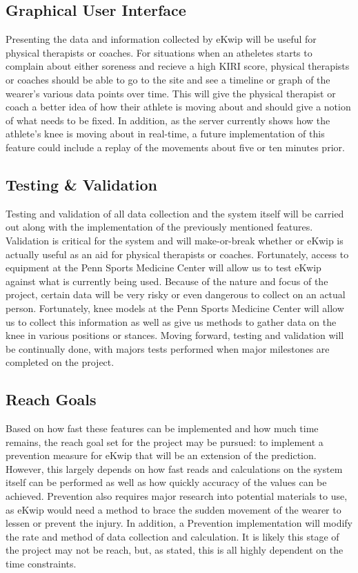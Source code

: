 \subsection {Graphical User Interface}
Presenting the data and information collected by eKwip will be useful for physical therapists or coaches. For situations when an atheletes starts to complain about either soreness and recieve a high KIRI score, physical therapists or coaches should be able to go to the site and see a timeline or graph of the wearer's various data points over time. This will give the physical therapist or coach a better idea of how their athlete is moving about and should give a notion of what needs to be fixed. In addition, as the server currently shows how the athlete's knee is moving about in real-time, a future implementation of this feature could include a replay of the movements about five or ten minutes prior.

\subsection {Testing \& Validation}
Testing and validation of all data collection and the system itself will be carried out along with the implementation of the previously mentioned features. Validation is critical for the system and will make-or-break whether or eKwip is actually useful as an aid for physical therapists or coaches. Fortunately, access to equipment at the Penn Sports Medicine Center will allow us to test eKwip against what is currently being used. Because of the nature and focus of the project, certain data will be very risky or even dangerous to collect on an actual person. Fortunately, knee models at the Penn Sports Medicine Center will allow us to collect this information as well as give us methods to gather data on the knee in various positions or stances. Moving forward, testing and validation will be continually done, with majors tests performed when major milestones are completed on the project.

\subsection {Reach Goals}
Based on how fast these features can be implemented and how much time remains, the reach goal set for the project may be pursued: to implement a prevention measure for eKwip that will be an extension of the prediction. However, this largely depends on how fast reads and calculations on the system itself can be performed as well as how quickly accuracy of the values can be achieved. Prevention also requires major research into potential materials to use, as eKwip would need a method to brace the sudden movement of the wearer to lessen or prevent the injury. In addition, a Prevention implementation will modify the rate and method of data collection and calculation. It is likely this stage of the project may not be reach, but, as stated, this is all highly dependent on the time constraints. 
